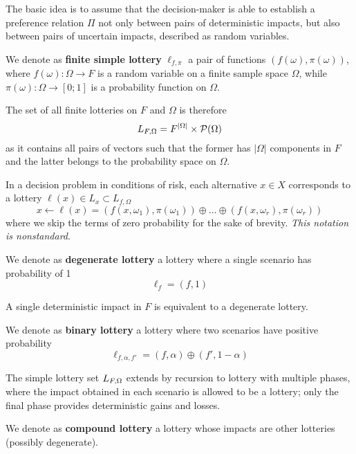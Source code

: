 The basic idea is to assume that the decision-maker is able to establish a preference relation $\Pi$ not only between pairs of deterministic impacts, but also between pairs of uncertain impacts, described as random variables. \\

\begin{definition}
	We denote as \textbf{finite simple lottery} $\ell_{f, \pi}$ a pair of functions $(f(\omega), \pi (\omega))$, where $f(\omega): \Omega \rightarrow F$ is a random variable on a finite sample space $\Omega$, while $\pi (\omega): \Omega \rightarrow [0;1]$ is a probability function on $\Omega$.
\end{definition}

The set of all finite lotteries on $F$ and $\Omega$ is therefore  
$$ L_{F, \Omega} = F^{|\Omega|} \times \mathcal{P} (\Omega) $$
as it contains all pairs of vectors such that the former has $|\Omega|$ components  in $F$ and the latter belongs to the probability space on $\Omega$. 

In a decision problem in conditions of risk, each alternative $x \in X$ corresponds to a lottery $\ell (x) \in L_x \subset L_{f, \Omega}$
$$ x \leftarrow \ell (x) = \left(f(x, \omega_1), \pi (\omega_1)\right) \oplus \dots \oplus \left(f(x, \omega_r), \pi (\omega_r)\right)$$
where we skip the terms of zero probability for the sake of brevity. \textit{This notation is nonstandard}. \\

\begin{definition}
	We denote as \textbf{degenerate lottery} a lottery where a single scenario has probability of 1
	$$ \ell_f = (f, 1) $$
\end{definition}

A single deterministic impact in $F$ is equivalent to a degenerate lottery. \\

\begin{definition}
	We denote as \textbf{binary lottery} a lottery where two scenarios have positive probability
	$$ \ell_{f, \alpha, f'} = (f, \alpha) \oplus (f', 1-\alpha)$$
\end{definition}

The simple lottery set $L_{F, \Omega}$ extends by recursion to lottery with multiple phases, where the impact obtained in each scenario is allowed to be a lottery; only the final phase provides deterministic gains and losses. \\

\begin{definition}
	We denote as \textbf{compound lottery} a lottery whose impacts are other lotteries (possibly degenerate).
\end{definition}

